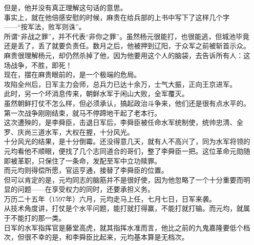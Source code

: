 \begin{multicols}{\theparacolNo}
但是，他并没有真正理解这句话的意思。\\

事实上，就在他倍感安慰的时候，麻贵在给兵部的上书中写下了这样几个字——“按军法，败军则诛”。\\

所谓“非战之罪”，并不代表“非你之罪”。虽然杨元很能打，也很能逃，但城池毕竟还是丢了，丢了就要负责任。数月之后，他被押到辽阳，于众军之前被斩首示众。\\

麻贵很理解杨元，却仍然杀掉了他，因为他要用这个人的脑袋，去告诉所有人：这场战争，不胜，即死！\\

现在，摆在麻贵眼前的，是一个极端的危局。\\

攻陷全州后，日军主力会师，总兵力已达十余万，士气大振，正向王京进军。\\

此时，另一个坏消息传来，朝鲜水军于闲山大败，全军覆灭。\\

虽然朝鲜打仗不怎么样，但必须承认，搞起政治斗争来，他们还是很有点水平的。第一次战争刚刚结束，就马不停蹄地干起了老本行。\\

这次遭殃的，是李舜臣，击退日军后，李舜臣被任命水军统制使，统帅忠清、全罗、庆尚三道水军，大权在握，十分风光。\\

十分风光的结果，是十分倒霉。还没得意几天，就有人不高兴了，同为水军将领的元均看他不顺眼，便找了几个志同道合的哥们，整了李舜臣一把。这位革命元勋随即被革职，只保住了一条命，发配至军中立功赎罪。\\

而元均则得偿所愿，官运亨通，接替了李舜臣的位置。\\

但可以肯定的是，元均同志的脑筋并不是很好使，因为他忽略了一个十分重要而明显的问题——在享受权力的同时，还要承担义务。\\

万历二十五年（1597年）六月，元均走马上任，七月七日，日军来袭。\\

从技术角度讲，打仗是个水平问题，能打就打得赢，不能打就打输。而元均，就属于不能打的那一类。\\

日军的水军指挥官是藤堂高虎，就其指挥水准而言，他比之前的九鬼嘉隆要低个档次，但很不幸的是，和李舜臣比起来，元均基本算是无档次。\\


\end{multicols}
